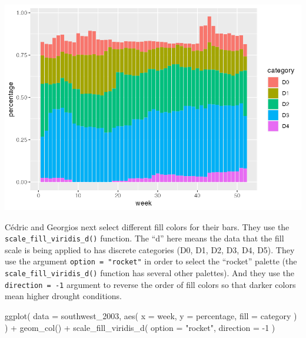 \documentclass[
]{book}
\newenvironment{Shaded}{\begin{snugshade}}{\end{snugshade}}
\newcommand{\AttributeTok}[1]{\textcolor[rgb]{0.77,0.63,0.00}{#1}}
\newcommand{\DecValTok}[1]{\textcolor[rgb]{0.00,0.00,0.81}{#1}}
\newcommand{\FunctionTok}[1]{\textcolor[rgb]{0.00,0.00,0.00}{#1}}
\newcommand{\NormalTok}[1]{#1}
\newcommand{\SpecialCharTok}[1]{\textcolor[rgb]{0.00,0.00,0.00}{#1}}
\newcommand{\StringTok}[1]{\textcolor[rgb]{0.31,0.60,0.02}{#1}}
\begin{document}
\includegraphics[width=1\linewidth]{data-viz_files/figure-latex/unnamed-chunk-28-1}

Cédric and Georgios next select different fill colors for their bars. They use the \texttt{scale\_fill\_viridis\_d()} function. The ``d'' here means the data that the fill scale is being applied to has discrete categories (D0, D1, D2, D3, D4, D5). They use the argument \texttt{option\ =\ "rocket"} in order to select the ``rocket'' palette (the \texttt{scale\_fill\_viridis\_d()} function has several other palettes). And they use the \texttt{direction\ =\ -1} argument to reverse the order of fill colors so that darker colors mean higher drought conditions.

\begin{Shaded}
\begin{Highlighting}[]
\FunctionTok{ggplot}\NormalTok{(}
  \AttributeTok{data =}\NormalTok{ southwest\_2003,}
  \FunctionTok{aes}\NormalTok{(}
    \AttributeTok{x =}\NormalTok{ week,}
    \AttributeTok{y =}\NormalTok{ percentage,}
    \AttributeTok{fill =}\NormalTok{ category}
\NormalTok{  )}
\NormalTok{) }\SpecialCharTok{+}
  \FunctionTok{geom\_col}\NormalTok{() }\SpecialCharTok{+}
  \FunctionTok{scale\_fill\_viridis\_d}\NormalTok{(}
    \AttributeTok{option =} \StringTok{"rocket"}\NormalTok{,}
    \AttributeTok{direction =} \SpecialCharTok{{-}}\DecValTok{1}
\NormalTok{  )}
\end{Highlighting}
\end{Shaded}
\end{document}
